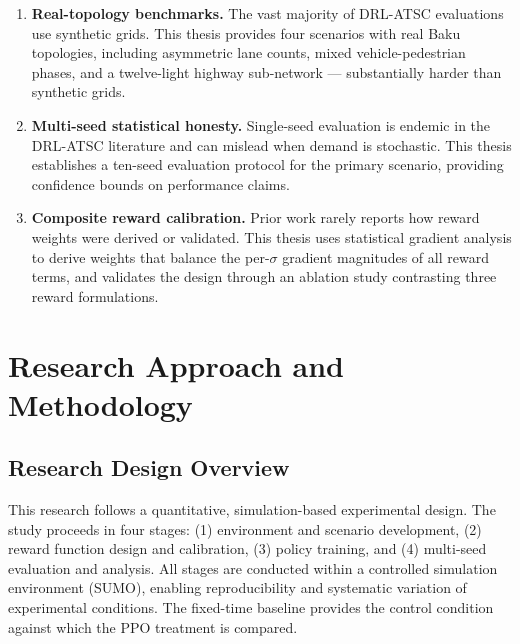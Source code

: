 \documentclass[12pt,oneside,a4paper]{report}
\newcommand{\ppo}{\textsc{PPO}}
\begin{document}
\begin{enumerate}[leftmargin=*]
  \item \textbf{Real-topology benchmarks.}
        The vast majority of DRL-ATSC evaluations use synthetic
        grids.  This thesis provides four scenarios with real Baku
        topologies, including asymmetric lane counts, mixed
        vehicle-pedestrian phases, and a twelve-light highway
        sub-network --- substantially harder than synthetic grids.

  \item \textbf{Multi-seed statistical honesty.}
        Single-seed evaluation is endemic in the DRL-ATSC literature
        and can mislead when demand is stochastic.  This thesis
        establishes a ten-seed evaluation protocol for the primary
        scenario, providing confidence bounds on performance claims.

  \item \textbf{Composite reward calibration.}
        Prior work rarely reports how reward weights were derived
        or validated.  This thesis uses statistical gradient analysis
        to derive weights that balance the per-$\sigma$ gradient
        magnitudes of all reward terms, and validates the design
        through an ablation study contrasting three reward formulations.
\end{enumerate}

\chapter{Research Approach and Methodology}
\label{chap:method}

\section{Research Design Overview}
\label{sec:design}

This research follows a quantitative, simulation-based experimental
design.  The study proceeds in four stages: (1) environment and
scenario development, (2) reward function design and calibration,
(3) policy training, and (4) multi-seed evaluation and analysis.
All stages are conducted within a controlled simulation environment
(SUMO), enabling reproducibility and systematic variation of
experimental conditions.  The fixed-time baseline provides the
control condition against which the \ppo{} treatment is compared.
\end{document}
